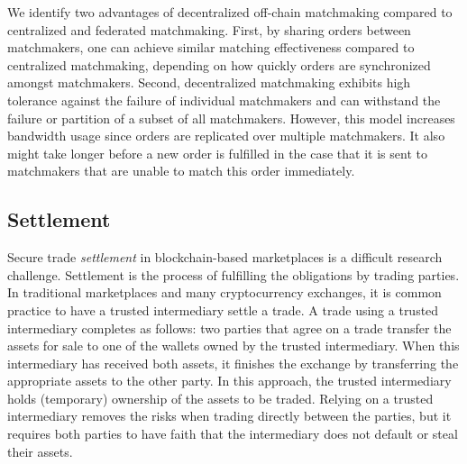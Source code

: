 

We identify two advantages of decentralized off-chain matchmaking compared to centralized and federated matchmaking.
First, by sharing orders between matchmakers, one can achieve similar matching effectiveness compared to centralized matchmaking, depending on how quickly orders are synchronized amongst matchmakers.
Second, decentralized matchmaking exhibits high tolerance against the failure of individual matchmakers and can withstand the failure or partition of a subset of all matchmakers.
However, this model increases bandwidth usage since orders are replicated over multiple matchmakers.
It also might take longer before a new order is fulfilled in the case that it is sent to matchmakers that are unable to match this order immediately.

\subsection{Settlement}
Secure trade \emph{settlement} in blockchain-based marketplaces is a difficult research challenge.
Settlement is the process of fulfilling the obligations by trading parties.
In traditional marketplaces and many cryptocurrency exchanges, it is common practice to have a trusted intermediary settle a trade.
A trade using a trusted intermediary completes as follows: two parties that agree on a trade transfer the assets for sale to one of the wallets owned by the trusted intermediary.
When this intermediary has received both assets, it finishes the exchange by transferring the appropriate assets to the other party.
In this approach, the trusted intermediary holds (temporary) ownership of the assets to be traded.
Relying on a trusted intermediary removes the risks when trading directly between the parties, but it requires both parties to have faith that the intermediary does not default or steal their assets.

